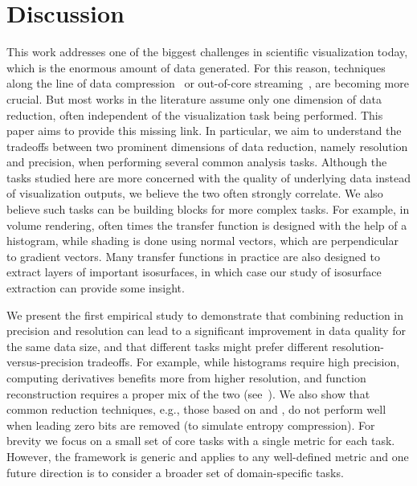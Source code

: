 \section{Discussion}

This work addresses one of the biggest challenges in scientific visualization today, which is the
enormous amount of data generated. For this reason, techniques along the line of data
compression~\cite{zfp2014} or out-of-core streaming~\cite{visualization-driven}, are becoming more
crucial. But most works in the literature assume only one dimension of data reduction, often
independent of the visualization task being performed. This paper aims to provide this missing link.
In particular, we aim to understand the tradeoffs between two prominent dimensions of data
reduction, namely resolution and precision, when performing several common analysis tasks. Although
the tasks studied here are more concerned with the quality of underlying data instead of
visualization outputs, we believe the two often strongly correlate. We also believe such tasks can
be building blocks for more complex tasks. For example, in volume rendering, often times the
transfer function is designed with the help of a histogram, while shading is done using normal
vectors, which are perpendicular to gradient vectors. Many transfer functions in practice are also
designed to extract layers of important isosurfaces, in which case our study of isosurface
extraction can provide some insight.

We present the first empirical study to demonstrate that combining reduction in precision and
resolution can lead to a significant improvement in data quality for the same data size, and that
different tasks might prefer different resolution-versus-precision tradeoffs. For example, while
histograms require high precision, computing derivatives benefits more from higher resolution, and
function reconstruction requires a proper mix of the two (see~). We also show
that common reduction techniques, e.g., those based on \slvl and \smag, do not perform well when
leading zero bits are removed (to simulate entropy compression). For brevity we focus on a small set
of core tasks with a single metric for each task. However, the framework is generic and applies to
any well-defined metric and one future direction is to consider a broader set of domain-specific
tasks. 

